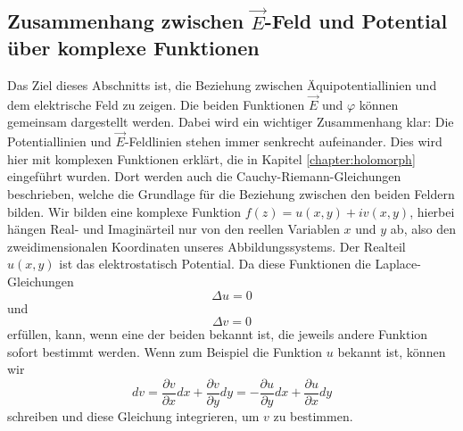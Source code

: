 \subsection{Zusammenhang zwischen $\vec{E}$-Feld und Potential über komplexe Funktionen
\label{elektro:subsection:komplex}}
Das Ziel dieses Abschnitts ist, die Beziehung zwischen Äquipotentiallinien und dem elektrische Feld zu zeigen.
Die beiden Funktionen $\vec{E}$ und $\varphi$ können gemeinsam dargestellt werden.
Dabei wird ein wichtiger Zusammenhang klar: Die Potentiallinien und $\vec{E}$-Feldlinien stehen immer senkrecht aufeinander.
Dies wird hier mit komplexen Funktionen erklärt, die in Kapitel \ref{chapter:holomorph} eingeführt wurden.
Dort werden auch die Cauchy-Riemann-Gleichungen beschrieben, welche die Grundlage für die Beziehung zwischen den beiden Feldern bilden.
%
Wir bilden eine komplexe Funktion $f(z) = u(x,y) + iv(x,y)$, hierbei hängen Real- und Imaginärteil nur von den reellen Variablen $x$ und $y$ ab, also den zweidimensionalen Koordinaten unseres Abbildungssystems.
Der Realteil $u(x,y)$ ist das elektrostatisch Potential.
Da diese Funktionen die Laplace-Gleichungen 
\begin{equation}
	\Delta u = 0
	\label{elektro:equation:laplace}
\end{equation}
und 
\begin{equation*}
	\Delta v = 0
\end{equation*}
erfüllen,
kann, wenn eine der beiden bekannt ist, die jeweils andere Funktion sofort bestimmt werden.
Wenn zum Beispiel die Funktion $u$
bekannt ist, können wir
\begin{equation*}
	dv = \frac{\partial v}{\partial x}dx + \frac{\partial v}{\partial y} dy = 
	-\frac{\partial u}{\partial y}dx + \frac{\partial u}{\partial x}dy
\end{equation*}
schreiben und diese Gleichung integrieren, um $v$ zu bestimmen.

